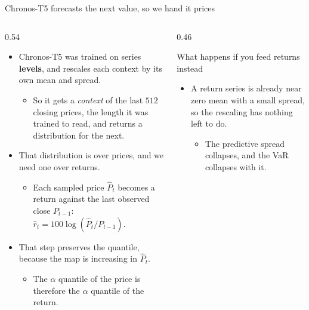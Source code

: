 \documentclass[9pt, aspectratio=169, t]{beamer}
\begin{document}
\begin{frame}{Chronos-T5 forecasts the next value, so we hand it prices}
  \begin{columns}[T]
    \begin{column}{0.54\textwidth}
      \begin{itemize}
        \item Chronos-T5 was trained on series \textbf{levels}, and rescales each
              context by its own mean and spread.
          \begin{itemize}
            \item So it gets a \emph{context} of the last $512$ closing prices, the
                  length it was trained to read, and returns a distribution for the next.
          \end{itemize}
        \item That distribution is over prices, and we need one over returns.
          \begin{itemize}
            \item Each sampled price $\hat P_{t}$ becomes a return against the last
                  observed close $P_{t-1}$:
                  $\hat r_{t} = 100\log(\hat P_{t}/P_{t-1})$.
          \end{itemize}
        \item That step preserves the quantile, because the map is increasing in
              $\hat P_{t}$.
          \begin{itemize}
            \item The $\alpha$ quantile of the price is therefore the $\alpha$ quantile
                  of the return.
          \end{itemize}
      \end{itemize}
    \end{column}
    \begin{column}{0.46\textwidth}
      \begin{alertblock}{What happens if you feed returns instead}
        \begin{itemize}
          \item A return series is already near zero mean with a small spread, so the
                rescaling has nothing left to do.
            \begin{itemize}
              \item The predictive spread collapses, and the VaR collapses with it.
            \end{itemize}
        \end{itemize}
      \end{alertblock}
    \end{column}
  \end{columns}
\end{frame}
\end{document}
